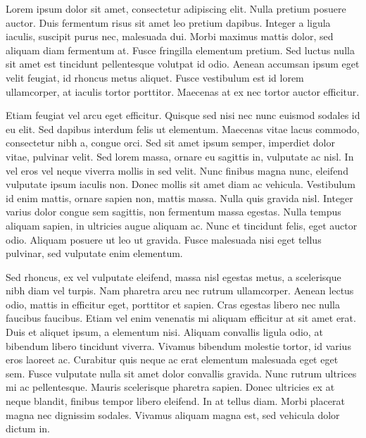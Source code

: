 \documentclass{article}
\begin{document}
  Lorem ipsum dolor sit amet, consectetur adipiscing elit. Nulla pretium posuere auctor. Duis fermentum risus sit amet leo pretium dapibus. Integer a ligula iaculis, suscipit purus nec, malesuada dui. Morbi maximus mattis dolor, sed aliquam diam fermentum at. Fusce fringilla elementum pretium. Sed luctus nulla sit amet est tincidunt pellentesque volutpat id odio. Aenean accumsan ipsum eget velit feugiat, id rhoncus metus aliquet. Fusce vestibulum est id lorem ullamcorper, at iaculis tortor porttitor. Maecenas at ex nec tortor auctor efficitur.
  
  Etiam feugiat vel arcu eget efficitur. Quisque sed nisi nec nunc euismod sodales id eu elit. Sed dapibus interdum felis ut elementum. Maecenas vitae lacus commodo, consectetur nibh a, congue orci. Sed sit amet ipsum semper, imperdiet dolor vitae, pulvinar velit. Sed lorem massa, ornare eu sagittis in, vulputate ac nisl. In vel eros vel neque viverra mollis in sed velit. Nunc finibus magna nunc, eleifend vulputate ipsum iaculis non. Donec mollis sit amet diam ac vehicula. Vestibulum id enim mattis, ornare sapien non, mattis massa. Nulla quis gravida nisl. Integer varius dolor congue sem sagittis, non fermentum massa egestas. Nulla tempus aliquam sapien, in ultricies augue aliquam ac. Nunc et tincidunt felis, eget auctor odio. Aliquam posuere ut leo ut gravida. Fusce malesuada nisi eget tellus pulvinar, sed vulputate enim elementum.
  
  Sed rhoncus, ex vel vulputate eleifend, massa nisl egestas metus, a scelerisque nibh diam vel turpis. Nam pharetra arcu nec rutrum ullamcorper. Aenean lectus odio, mattis in efficitur eget, porttitor et sapien. Cras egestas libero nec nulla faucibus faucibus. Etiam vel enim venenatis mi aliquam efficitur at sit amet erat. Duis et aliquet ipsum, a elementum nisi. Aliquam convallis ligula odio, at bibendum libero tincidunt viverra. Vivamus bibendum molestie tortor, id varius eros laoreet ac. Curabitur quis neque ac erat elementum malesuada eget eget sem. Fusce vulputate nulla sit amet dolor convallis gravida. Nunc rutrum ultrices mi ac pellentesque. Mauris scelerisque pharetra sapien. Donec ultricies ex at neque blandit, finibus tempor libero eleifend. In at tellus diam. Morbi placerat magna nec dignissim sodales. Vivamus aliquam magna est, sed vehicula dolor dictum in. 
  
\end{document}
